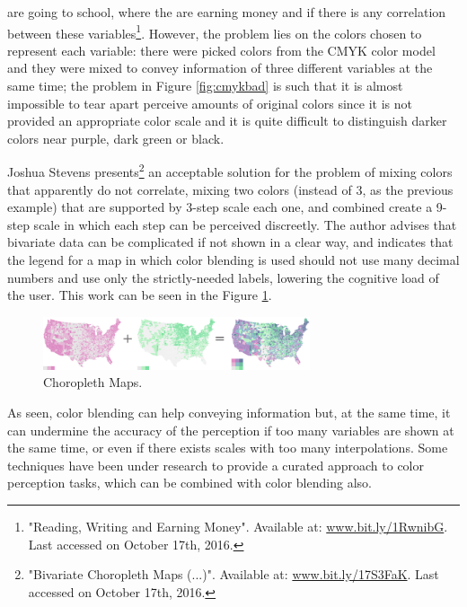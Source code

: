 are going to school, where the are earning money and if there is any correlation between these variables\footnote{"Reading,
Writing and Earning Money". Available at: \url{www.bit.ly/1RwnibG}.
Last accessed on October 17th, 2016.}. However, the problem lies on the colors chosen to represent each variable: there were picked
colors from the CMYK color model and they
were mixed to convey information of three different variables at the same time; the problem in Figure \ref{fig:cmykbad} is such that
it is almost impossible to tear apart perceive amounts of original colors since it is not provided an appropriate color
scale and it is quite difficult to distinguish darker colors near purple, dark green or black. \par
%
Joshua Stevens presents\footnote{"Bivariate Choropleth Maps (...)". Available at:
\url{www.bit.ly/17S3FaK}. Last accessed on October 17th, 2016.} an acceptable
solution for the problem of mixing colors that apparently do not correlate, mixing two colors (instead of 3, as the
previous example) that are supported by 3-step scale each one, and combined create a 9-step scale in which each step
can be perceived discreetly. The author advises that bivariate data can be complicated if not shown in a clear
way, and indicates that the legend for a map in which color blending is used should not use many decimal numbers and use
only the strictly-needed labels, lowering the cognitive load of the user. This work can be seen in the Figure \ref{fig:choropleth}.\\
%
\begin{figure}[H]
	\centering
    \vspace{-10pt}
    \includegraphics[width=0.7\textwidth]{images/background/js_choroMath.png}
    \caption[Bivariate Choropleth Maps]{Choropleth Maps.\protect\footnotemark[26]}
    \vspace{-10pt}
    \label{fig:choropleth}
\end{figure}
%
As seen, color blending can help conveying information but, at the same time, it can undermine the accuracy of
the perception if too many variables are shown at the same time, or even if there exists scales with too many
interpolations. Some techniques have been under research to provide a curated approach to color perception
tasks, which can be combined with color blending also.
%
